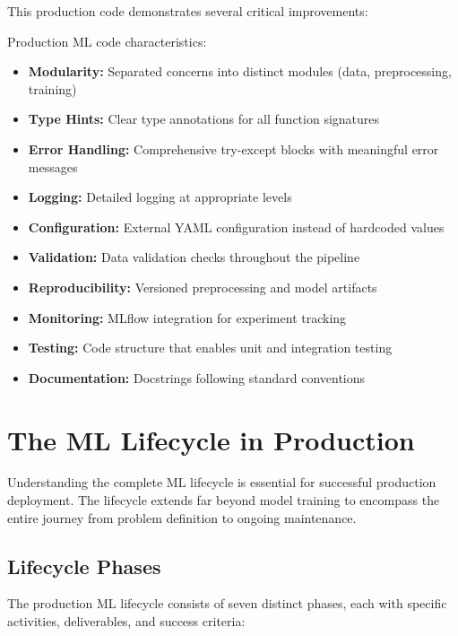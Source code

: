 This production code demonstrates several critical improvements:

\begin{bestpractice}
Production ML code characteristics:
\begin{itemize}
    \item \textbf{Modularity:} Separated concerns into distinct modules (data, preprocessing, training)
    \item \textbf{Type Hints:} Clear type annotations for all function signatures
    \item \textbf{Error Handling:} Comprehensive try-except blocks with meaningful error messages
    \item \textbf{Logging:} Detailed logging at appropriate levels
    \item \textbf{Configuration:} External YAML configuration instead of hardcoded values
    \item \textbf{Validation:} Data validation checks throughout the pipeline
    \item \textbf{Reproducibility:} Versioned preprocessing and model artifacts
    \item \textbf{Monitoring:} MLflow integration for experiment tracking
    \item \textbf{Testing:} Code structure that enables unit and integration testing
    \item \textbf{Documentation:} Docstrings following standard conventions
\end{itemize}
\end{bestpractice}

\section{The ML Lifecycle in Production}

Understanding the complete ML lifecycle is essential for successful production deployment. The lifecycle extends far beyond model training to encompass the entire journey from problem definition to ongoing maintenance.

\subsection{Lifecycle Phases}

The production ML lifecycle consists of seven distinct phases, each with specific activities, deliverables, and success criteria:

